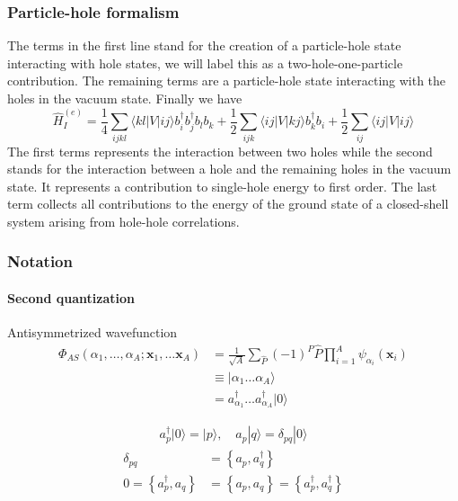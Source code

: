 \documentclass[compress]{beamer}
\newcommand*{\ket}[1]{|#1\rangle}
\newcommand*{\bra}[1]{\langle#1|}
\newcommand{\element}[3]
        {\bra{#1}#2\ket{#3}}
\begin{document}
\frame
{
  \frametitle{Particle-hole formalism}
\begin{small}
{\scriptsize
The terms in the first line  stand for the creation of a particle-hole state 
interacting with hole states, we will label this as a two-hole-one-particle contribution. 
The remaining terms are a particle-hole state interacting with the holes in the vacuum state. 
Finally we have 
\begin{equation}
	\hat{H}_I^{(e)} = \frac{1}{4}
		 \sum_{ijkl}
		 \element{kl}{V}{ij}b_i^\dagger b_j^\dagger b_l b_k+
	        \frac{1}{2}\sum_{ijk}\element{ij}{V}{kj}b_k^\dagger b_i
	        +\frac{1}{2}\sum_{ij}\element{ij}{V}{ij}\label{eq:2-70d}
\end{equation}
The first terms represents the 
interaction between two holes while the second stands for the interaction between a hole and the remaining holes in the vacuum state.
It represents a contribution to single-hole energy  to first order.
The last term collects all contributions to the energy of the ground state of a closed-shell system arising
from hole-hole correlations.
}
\end{small}
}



%
\begin{frame}[fragile]
    \frametitle{Notation}
    \framesubtitle{Second quantization}
    \begin{block}{Antisymmetrized wavefunction}
    \begin{align*}
        \Phi_{AS}(\alpha_1, \dots, \alpha_A; \mathbf{x}_1, \dots \mathbf{x}_A) &= 
            \frac{1}{\sqrt{A}} \sum_{\hat{P}} (-1)^P \hat{P} \prod_{i=1}^A \psi_{\alpha_i}(\mathbf{x}_i) \\
        &\equiv \ket{\alpha_1 \dots \alpha_A} \\
        &= a_{\alpha_1}^\dagger \dots a_{\alpha_A}^\dagger \ket{0}
    \end{align*}
    \end{block}
    \begin{align*}
        a_p^\dagger\ket{0} = \ket{p}, \quad a_p \ket{q} = \delta_{pq}\ket{0}
    \end{align*}
    \begin{align*}
        \delta_{pq} &= \left\{a_p, a_q^\dagger \right\} \\
        0 = \left\{a_p^\dagger, a_q \right\} &= \left\{a_p, a_q \right\} = \left\{a_p^\dagger, a_q^\dagger \right\}
    \end{align*}
\end{frame}
\end{document}
